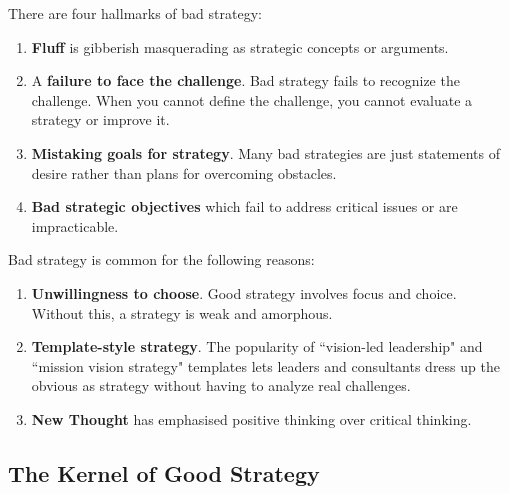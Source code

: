 \documentclass{article}
\newenvironment{nosepenumerate}
{ \begin{enumerate}
    \setlength{\itemsep}{0pt}
    \setlength{\parskip}{0pt}
    \setlength{\parsep}{0pt}     }
{ \end{enumerate}                  }
\begin{document}
\begin{multicols}{2}

\noindent
There are four hallmarks of bad strategy:

\begin{nosepenumerate}
    \item \textbf{Fluff} is gibberish masquerading as strategic concepts or arguments.
    \item A \textbf{failure to face the challenge}. Bad strategy fails to recognize the challenge. When you cannot define the challenge, you cannot evaluate a strategy or improve it.
    \item \textbf{Mistaking goals for strategy}. Many bad strategies are just statements of desire rather than plans for overcoming obstacles.
    \item \textbf{Bad strategic objectives} which fail to address critical issues or are impracticable.
\end{nosepenumerate}

\columnbreak

\noindent
Bad strategy is common for the following reasons:

\begin{nosepenumerate}
    \item \textbf{Unwillingness to choose}. Good strategy involves focus and choice. Without this, a strategy is weak and amorphous.
    \item \textbf{Template-style strategy}. The popularity of ``vision-led leadership" and ``mission vision strategy" templates lets leaders and consultants dress up the obvious as strategy without having to analyze real challenges. 
    \item \textbf{New Thought} has emphasised positive thinking over critical thinking.
\end{nosepenumerate}

\end{multicols}

\begin{center}
\section{The Kernel of Good Strategy}
\end{center}
\end{document}
